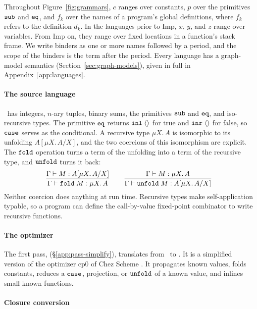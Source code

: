 Throughout Figure~\ref{fig:grammars}, $c$ ranges over constants, $p$
over the primitives $\mathtt{sub}$ and $\mathtt{eq}$, and $f_k$ over the names
of a program's global definitions, where $f_k$ refers to the
definition $d_k$. In the languages prior to Imp, $x$, $y$, and $z$
range over variables. From Imp on, they range over fixed locations in
a function's stack frame. We write binders as one or more names
followed by a period, and the scope of the binders is the term after
the period. Every language has a graph-model semantics
(Section~\ref{sec:graph-models}), given in full in
Appendix~\ref{app:languages}.

\paragraph{The source language}

\fpc\ has integers, $n$-ary tuples, binary sums, the primitives $\mathtt{sub}$ and
$\mathtt{eq}$, and iso-recursive types. The primitive $\mathtt{eq}$ returns
$\mathtt{inl}\;\langle\rangle$ for true and $\mathtt{inr}\;\langle\rangle$ for false, so
$\mathtt{case}$ serves as the conditional. A recursive type $\mu X.\, A$ is
isomorphic to its unfolding $A[\mu X.\, A / X]$, and the two coercions of this
isomorphism are explicit. The $\mathtt{fold}$ operation turns a term of the
unfolding into a term of the recursive type, and $\mathtt{unfold}$ turns it back:
\[
  \frac{\Gamma \vdash M : A[\mu X.\, A / X]}{\Gamma \vdash \mathtt{fold}\;M : \mu X.\, A}
  \qquad
  \frac{\Gamma \vdash M : \mu X.\, A}{\Gamma \vdash \mathtt{unfold}\;M : A[\mu X.\, A / X]}
\]
Neither coercion does anything at run time. Recursive types make
self-application typable, so a program can define the call-by-value
fixed-point combinator to write recursive functions.

\paragraph{The optimizer}

The first pass,  (\S\ref{app:pass-simplify}), translates from \fpc\ to \fpc. It is a simplified version of the
optimizer cp0 of Chez Scheme \citep{Waddell:1997fk}. It propagates
known values, folds constants, reduces a
$\mathtt{case}$, projection, or $\mathtt{unfold}$ of a known value, and
inlines small known functions.

\paragraph{Closure conversion}

